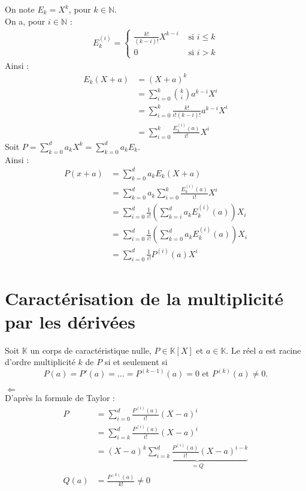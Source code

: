 \documentclass[../main.tex]{subfiles}
\begin{document}
\noindent On note $E_k = X^k$, pour $k \in \mathbb{N}$. \\
On a, pour $i \in \mathbb{N}$ : 
\begin{align*}
    E_k^{(i)} = \begin{cases}
        \frac{k!}{(k-i)!}X^{k-i} & \text{ si } i \leq k \\
        0 & \text{ si } i > k
    \end{cases}
\end{align*}
Ainsi : 
\begin{align*}
    E_k(X + a) &= (X + a)^k \\
    &= \sum_{i=0}^{k} \binom{k}{i} a^{k-i} X^i \\
    &= \sum_{i=0}^{k} \frac{k!}{i!(k-i)!} a^{k-i} X^i \\
    &= \sum_{i=0}^{k} \frac{E_k^{(i)}(a)}{i!} X^i
\end{align*}
Soit $P = \sum\limits_{k=0}^{d} a_k X^k = \sum_{k=0}^{d} a_k E_k$. \\
Ainsi :
\begin{align*}
    P(x + a) &= \sum_{k=0}^{d} a_k E_k(X + a) \\
    &= \sum_{k=0}^{d} a_k \sum_{i=0}^{k} \frac{E_k^{(i)}(a)}{i!} X^i \\
    &= \sum_{i=0}^{d} \frac{1}{i!} \left( \sum_{k=i}^{d} a_k E_k^{(i)}(a) \right) X_i \\
    &= \sum_{i=0}^{d} \frac{1}{i!} \left( \sum_{k=0}^{d} a_k E_k^{(i)}(a) \right) X_i \\
    &= \sum_{i=0}^{d} \frac{1}{i!} P^{(i)}(a) X^i
\end{align*}

\section{Caractérisation de la multiplicité par les dérivées}
\begin{tcolorbox}[title=Théorème 16.57, title filled=false, colframe=orange, colback=orange!10!white]
    Soit $\mathbb{K}$ un corps de caractéristique nulle, $P \in \mathbb{K}[X]$ et $a \in \mathbb{K}$. Le réel $a$ est racine d'ordre multiplicité $k$ de $P$ si et seulement si 
    $$P(a) = P'(a) = \ldots = P^{(k-1)}(a) = 0 \text{ et } P^{(k)}(a) \neq 0.$$
\end{tcolorbox}

$\boxed{\Leftarrow}$ \\
D'après la formule de Taylor : 
\begin{align*}
    P &= \sum_{i=0}^{d} \frac{P^{(i)}(a)}{i!} (X - a)^i \\
    &= \sum_{i=k}^{d} \frac{P^{(i)}(a)}{i!} (X - a)^i \\
    &= (X - a)^k \underbrace{\sum_{i=k}^{d} \frac{P^{(i)}(a)}{i!} (X - a)^{i-k}}_{= Q} \\
    Q(a) &= \frac{P^{(k)}(a)}{k!} \neq 0
\end{align*}
\end{document}
